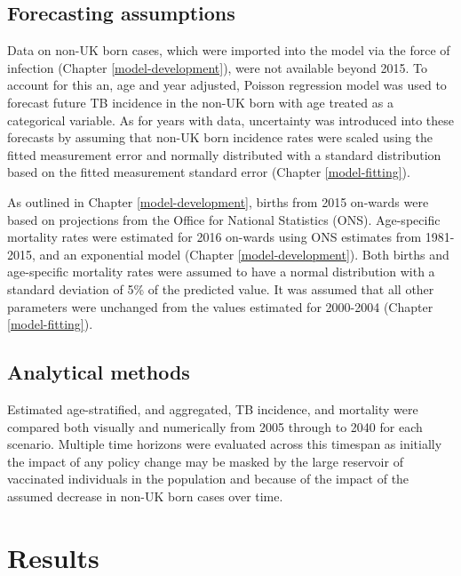 \documentclass[11pt,twoside]{bristolthesis}
\begin{document}
  \hypertarget{forecasting-assumptions}{%
  \subsection{Forecasting assumptions}\label{forecasting-assumptions}}
  
  Data on non-UK born cases, which were imported into the model via the force of infection (Chapter \ref{model-development}), were not available beyond 2015. To account for this an, age and year adjusted, Poisson regression model was used to forecast future TB incidence in the non-UK born with age treated as a categorical variable. As for years with data, uncertainty was introduced into these forecasts by assuming that non-UK born incidence rates were scaled using the fitted measurement error and normally distributed with a standard distribution based on the fitted measurement standard error (Chapter \ref{model-fitting}).
  
  As outlined in Chapter \ref{model-development}, births from 2015 on-wards were based on projections from the Office for National Statistics (ONS). Age-specific mortality rates were estimated for 2016 on-wards using ONS estimates from 1981-2015, and an exponential model (Chapter \ref{model-development}). Both births and age-specific mortality rates were assumed to have a normal distribution with a standard deviation of 5\% of the predicted value. It was assumed that all other parameters were unchanged from the values estimated for 2000-2004 (Chapter \ref{model-fitting}).
  
  \hypertarget{analytical-methods}{%
  \subsection{Analytical methods}\label{analytical-methods}}
  
  Estimated age-stratified, and aggregated, TB incidence, and mortality were compared both visually and numerically from 2005 through to 2040 for each scenario. Multiple time horizons were evaluated across this timespan as initially the impact of any policy change may be masked by the large reservoir of vaccinated individuals in the population and because of the impact of the assumed decrease in non-UK born cases over time.
  
  \hypertarget{results-4}{%
  \section{Results}\label{results-4}}
  
\end{document}
